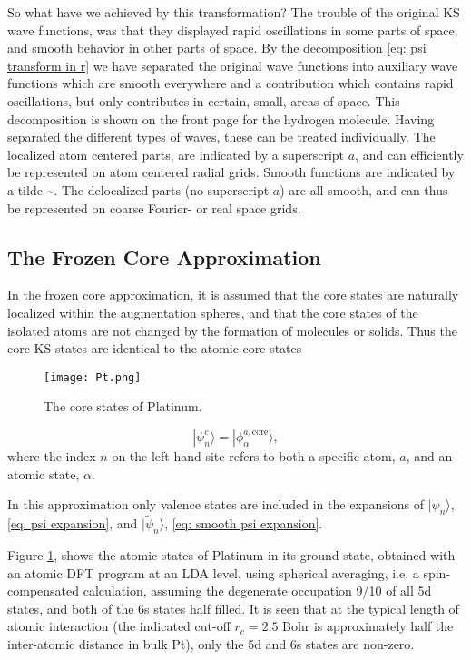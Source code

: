 \documentclass[a4paper]{article}
\newcommand{\s}[1]{\tilde{#1}}
\newcommand{\ket}[1]{| #1 \rangle}
\begin{document}
\par So what have we achieved by this transformation? The trouble of
the original KS wave functions, was that they displayed rapid
oscillations in some parts of space, and smooth behavior in other
parts of space. By the decomposition \ref{eq: psi transform in r} we
have separated the original wave functions into auxiliary wave
functions which are smooth everywhere and a contribution which
contains rapid oscillations, but only contributes in certain, small,
areas of space. This decomposition is shown on the front page for the
hydrogen molecule. Having separated the different types of waves,
these can be treated individually. The localized atom centered parts,
are indicated by a superscript $a$, and can efficiently be represented
on atom centered radial grids. Smooth functions are indicated by a
tilde \~{}. The delocalized parts (no superscript $a$) are all smooth,
and can thus be represented on coarse Fourier- or real space grids.

\subsection{The Frozen Core Approximation}\label{sec: frozen core}
In the frozen core approximation, it is assumed that the core states
are naturally localized within the augmentation spheres, and that the
core states of the isolated atoms are not changed by the formation of
molecules or solids. Thus the core KS states are identical to the
atomic core states
%
\begin{figure}
  \begin{center}
    \texttt{[image: Pt.png]}%
    \caption{The core states of Platinum.}\label{fig: frozen core}%
  \end{center}
\end{figure}
%
\begin{equation*}
\ket{\psi^c_n} = \ket{\phi_\alpha^{a,\text{core}}},
\end{equation*}
%
where the index $n$ on the left hand site refers to both a specific
atom, $a$, and an atomic state, $\alpha$.
\par In this approximation only valence states are included in the
expansions of $\ket{\psi_n}$, \ref{eq: psi expansion}, and
$\ket{\s{\psi}_n}$, \ref{eq: smooth psi expansion}.
\par Figure \ref{fig: frozen core}, shows the atomic states of
Platinum in its ground state, obtained with an atomic DFT program at
an LDA level, using spherical averaging, i.e. a spin-compensated
calculation, assuming the degenerate occupation 9/10 of all 5d states,
and both of the 6s states half filled. It is seen that at the typical
length of atomic interaction (the indicated cut-off $r_c=2.5$ Bohr is
approximately half the inter-atomic distance in bulk Pt), only the 5d
and 6s states are non-zero.
\end{document}

